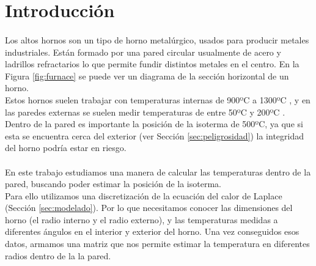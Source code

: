 \documentclass[12pt]{article}
\begin{document}

\fecha{\today}



\maketitle

\tableofcontents

\section{Introducción}
\label{sec:intro}


\paragraph{} Los altos hornos son un tipo de horno metalúrgico, usados para producir metales industriales. Están formado por una pared circular usualmente de acero y ladrillos refractarios \cite{how.it.works} lo que permite fundir distintos metales en el centro. En la Figura \ref{fig:furnace} se puede ver un diagrama de la sección horizontal de un horno. \\
Estos hornos suelen trabajar con temperaturas internas de 900ºC a 1300ºC \cite{how.it.works}, y en las paredes externas se suelen medir temperaturas de entre 50ºC y 200ºC \cite{consigna}. Dentro de la pared es importante la posición de la isoterma de 500ºC, ya que si esta se encuentra cerca del exterior (ver Sección \ref{sec:peligrosidad}) la integridad del horno podría estar en riesgo.


\paragraph{} En este trabajo estudiamos una manera de calcular las temperaturas dentro de la pared, buscando poder estimar la posición de la isoterma. \\
Para ello utilizamos una discretización de la ecuación del calor de Laplace (Sección \ref{sec:modelado}). Por lo que necesitamos conocer las dimensiones del horno (el radio interno y el radio externo), y las temperaturas medidas a diferentes ángulos en el interior y exterior del horno. Una vez conseguidos esos datos, armamos una matriz que nos permite estimar la temperatura en diferentes radios dentro de la la pared. %
\end{document}
